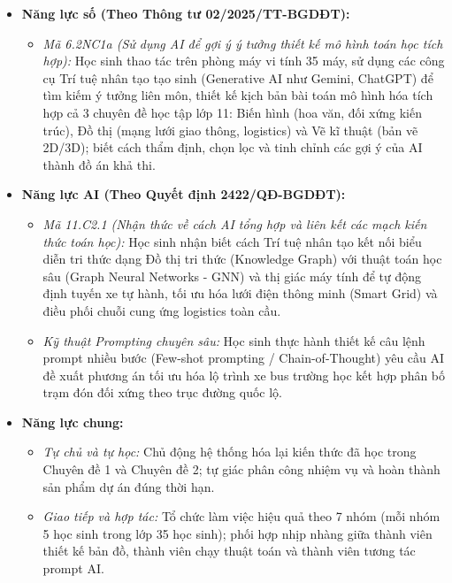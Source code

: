 \documentclass[12pt, a4paper]{article}
\begin{document}
\begin{itemize}[leftmargin=1.2cm]
    \item \textbf{Năng lực số (Theo Thông tư 02/2025/TT-BGDĐT):}
    \begin{itemize}[leftmargin=0.6cm]
        \item \textit{Mã 6.2NC1a (Sử dụng AI để gợi ý ý tưởng thiết kế mô hình toán học tích hợp):} Học sinh thao tác trên phòng máy vi tính 35 máy, sử dụng các công cụ Trí tuệ nhân tạo tạo sinh (Generative AI như Gemini, ChatGPT) để tìm kiếm ý tưởng liên môn, thiết kế kịch bản bài toán mô hình hóa tích hợp cả 3 chuyên đề học tập lớp 11: Biến hình (hoa văn, đối xứng kiến trúc), Đồ thị (mạng lưới giao thông, logistics) và Vẽ kĩ thuật (bản vẽ 2D/3D); biết cách thẩm định, chọn lọc và tinh chỉnh các gợi ý của AI thành đồ án khả thi.
    \end{itemize}

    \item \textbf{Năng lực AI (Theo Quyết định 2422/QĐ-BGDĐT):}
    \begin{itemize}[leftmargin=0.6cm]
        \item \textit{Mã 11.C2.1 (Nhận thức về cách AI tổng hợp và liên kết các mạch kiến thức toán học):} Học sinh nhận biết cách Trí tuệ nhân tạo kết nối biểu diễn tri thức dạng Đồ thị tri thức (Knowledge Graph) với thuật toán học sâu (Graph Neural Networks - GNN) và thị giác máy tính để tự động định tuyến xe tự hành, tối ưu hóa lưới điện thông minh (Smart Grid) và điều phối chuỗi cung ứng logistics toàn cầu.
        \item \textit{Kỹ thuật Prompting chuyên sâu:} Học sinh thực hành thiết kế câu lệnh prompt nhiều bước (Few-shot prompting / Chain-of-Thought) yêu cầu AI đề xuất phương án tối ưu hóa lộ trình xe bus trường học kết hợp phân bố trạm đón đối xứng theo trục đường quốc lộ.
    \end{itemize}

    \item \textbf{Năng lực chung:}
    \begin{itemize}[leftmargin=0.6cm]
        \item \textit{Tự chủ và tự học:} Chủ động hệ thống hóa lại kiến thức đã học trong Chuyên đề 1 và Chuyên đề 2; tự giác phân công nhiệm vụ và hoàn thành sản phẩm dự án đúng thời hạn.
        \item \textit{Giao tiếp và hợp tác:} Tổ chức làm việc hiệu quả theo 7 nhóm (mỗi nhóm 5 học sinh trong lớp 35 học sinh); phối hợp nhịp nhàng giữa thành viên thiết kế bản đồ, thành viên chạy thuật toán và thành viên tương tác prompt AI.
    \end{itemize}
\end{itemize}
\end{document}
